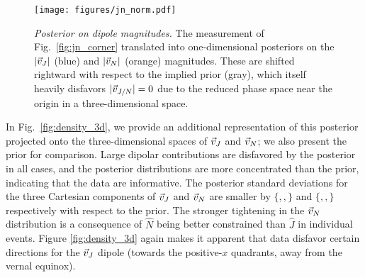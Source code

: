 \documentclass[aps,prd,twocolumn,superscriptaddress,preprintnumbers,floatfix,nofootinbib]{revtex4-2}
\newcommand{\varimpNx}{}
\newcommand{\varimpNy}{}
\newcommand{\varimpNz}{}
\newcommand{\varimpJx}{}
\newcommand{\varimpJy}{}
\newcommand{\varimpJz}{}
\begin{document}
\begin{figure}
\texttt{[image: figures/jn\_norm.pdf]}
\caption{\emph{Posterior on dipole magnitudes.} The measurement of Fig.~\ref{fig:jn_corner} translated into one-dimensional posteriors on the $|\vec{v}_{J}|$ (blue) and $|\vec{v}_{N}|$ (orange) magnitudes.
These are shifted rightward with respect to the implied prior (gray), which itself heavily disfavors $|\vec{v}_{J/N}|=0$ due to the reduced phase space near the origin in a three-dimensional space.
}
\label{fig:jn_norm}
\end{figure}

In Fig.~\ref{fig:density_3d}, we provide an additional representation of this posterior projected onto the three-dimensional spaces of $\vec{v}_{J}$ and $\vec{v}_{N}$; we also present the prior for comparison.
Large dipolar contributions are disfavored by the posterior in all cases, and the posterior distributions are more concentrated than the prior, indicating that the data are informative.
The posterior standard deviations for the three Cartesian components of $\vec{v}_{J}$ and $\vec{v}_{N}$ are smaller by $\{\varimpJx, \varimpJy, \varimpJz\}$ and $\{\varimpNx, \varimpNy, \varimpNz\}$ respectively with respect to the prior.
The stronger tightening in the $\vec{v}_{N}$ distribution is a consequence of $\hat{N}$ being better constrained than $\hat{J}$ in individual events.
Figure \ref{fig:density_3d} again makes it apparent that data disfavor certain directions for the $\vec{v}_{J}$ dipole (towards the positive-$x$ quadrants, away from the vernal equinox).
\end{document}
